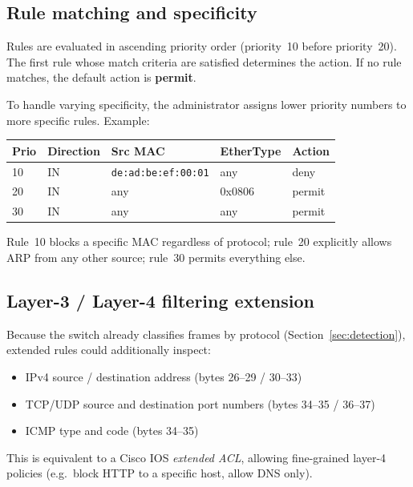 \documentclass[12pt,a4paper]{article}
\begin{document}
\subsection{Rule matching and specificity}

Rules are evaluated in ascending priority order (priority~10 before
priority~20).  The first rule whose match criteria are satisfied determines
the action.  If no rule matches, the default action is \textbf{permit}.

To handle varying specificity, the administrator assigns lower priority numbers
to more specific rules.  Example:

\begin{center}
\begin{tabular}{lllll}
\toprule
\textbf{Prio} & \textbf{Direction} & \textbf{Src MAC} & \textbf{EtherType} & \textbf{Action} \\
\midrule
10 & IN & \texttt{de:ad:be:ef:00:01} & any    & deny   \\
20 & IN & any                        & 0x0806 & permit \\
30 & IN & any                        & any    & permit \\
\bottomrule
\end{tabular}
\end{center}

Rule~10 blocks a specific MAC regardless of protocol; rule~20 explicitly allows
ARP from any other source; rule~30 permits everything else.

\subsection{Layer-3 / Layer-4 filtering extension}

Because the switch already classifies frames by protocol
(Section~\ref{sec:detection}), extended rules could additionally inspect:

\begin{itemize}[noitemsep]
  \item IPv4 source / destination address (bytes 26--29 / 30--33)
  \item TCP/UDP source and destination port numbers (bytes 34--35 / 36--37)
  \item ICMP type and code (bytes 34--35)
\end{itemize}

This is equivalent to a Cisco IOS \emph{extended ACL}, allowing fine-grained
layer-4 policies (e.g.\ block HTTP to a specific host, allow DNS only).
\end{document}
